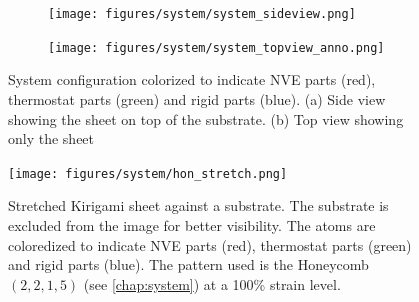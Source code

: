 \begin{figure}[H]
  \centering
  \begin{subfigure}[b]{0.65\textwidth}
      \centering
      \texttt{[image: figures/system/system\_sideview.png]}
      \caption{}
      \label{fig:sideview}
  \end{subfigure}
  \hfill
  \begin{subfigure}[b]{0.70\textwidth}
      \centering
      \texttt{[image: figures/system/system\_topview\_anno.png]}
      \caption{}
      \label{fig:topview}
  \end{subfigure}
  \hfill
     \caption{System configuration colorized to indicate NVE parts (red), thermostat parts (green) and rigid parts (blue). (a) Side view showing the sheet on top of the substrate. (b) Top view showing only the sheet}
     \label{fig:system}
\end{figure}


\begin{figure}[H]
  \centering
  \texttt{[image: figures/system/hon\_stretch.png]}
  \caption{Stretched Kirigami sheet against a substrate. The substrate is excluded from the image for better visibility. The atoms are coloredized to indicate NVE parts (red), thermostat parts (green) and rigid parts (blue). The pattern used is the Honeycomb $(2,2,1,5)$ (see \cref{chap:system}) at a 100\% strain level.}
  \label{fig:kirigami_stretch}
\end{figure}



